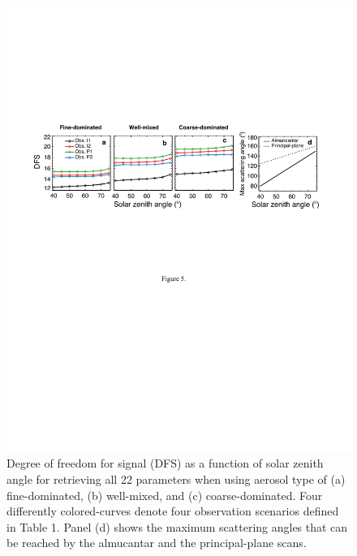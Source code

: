 \begin{figure}[t]
  \centering
  \includegraphics[width={\textwidth}]{figures/info05.pdf}
  \caption[Degree of freedom for signal (DFS) as a function of solar
zenith angle for retrieving all 22 parameters.]
  {Degree of freedom for signal (DFS) as a function of solar zenith
angle for retrieving all 22 parameters when using aerosol type of (a)
fine-dominated,  (b) well-mixed, and (c) coarse-dominated. Four differently
colored-curves denote four observation scenarios defined in Table 1. Panel (d)
shows the maximum scattering angles that can be reached by the almucantar and
the principal-plane scans.}
  \label{fig:infodfs1}
\end{figure}

